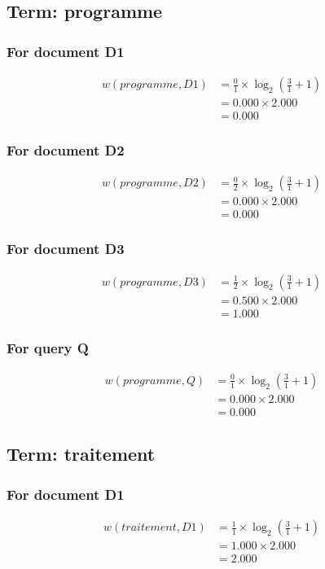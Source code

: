 \documentclass{article}
\begin{document}
\subsection{Term: programme}
\subsubsection*{For document D1}
\begin{align}
w(programme, D1) &= \frac{0}{1} \times \log_{2}\left(\frac{3}{1} + 1\right) \\
&= 0.000 \times 2.000 \\
&= 0.000
\end{align}

\subsubsection*{For document D2}
\begin{align}
w(programme, D2) &= \frac{0}{2} \times \log_{2}\left(\frac{3}{1} + 1\right) \\
&= 0.000 \times 2.000 \\
&= 0.000
\end{align}

\subsubsection*{For document D3}
\begin{align}
w(programme, D3) &= \frac{1}{2} \times \log_{2}\left(\frac{3}{1} + 1\right) \\
&= 0.500 \times 2.000 \\
&= 1.000
\end{align}

\subsubsection*{For query Q}
\begin{align}
w(programme, Q) &= \frac{0}{1} \times \log_{2}\left(\frac{3}{1} + 1\right) \\
&= 0.000 \times 2.000 \\
&= 0.000
\end{align}

\subsection{Term: traitement}
\subsubsection*{For document D1}
\begin{align}
w(traitement, D1) &= \frac{1}{1} \times \log_{2}\left(\frac{3}{1} + 1\right) \\
&= 1.000 \times 2.000 \\
&= 2.000
\end{align}
\end{document}
